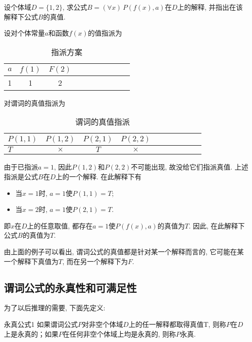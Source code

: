 \begin{example}
  设个体域$D=\{1, 2\}$, 求公式$B=(\forall x)\,P(f(x), a)$在$D$上的解释, 并指出在该解释下公式$B$的真值.
\end{example}
\begin{result}
设对个体常量$a$和函数$f(x)$的值指派为
\begin{table}[H]
\caption{指派方案}
\vspace{-0.6cm}
\begin{center}
\begin{tabular} {lccccccccc}
  \hline
$a$	&$f(1)$&$	F(2)$\\
\hline
1&	1	&2\\
\hline
\end{tabular}
\end{center}
\label{AI_table2019113003}
\end{table}
对谓词的真值指派为
\begin{table}[H]
\caption{谓词的真值指派}
\vspace{-0.6cm}
\begin{center}
\begin{tabular} {lccccccccc}
\hline
     $P(1,1)$&	  $P(1,2)$	&   $P(2,1)$&	   $P(2,2)$\\
\hline
     $T$	&   $\times$	&   $T$	&   $\times$	\\
\hline
\end{tabular}
\end{center}
\label{AI_table2019113004}
\end{table}
由于已指派$a=1$, 因此$P(1,2)$和$P(2,2)$不可能出现, 故没给它们指派真值.
上述指派是公式$B$在$D$上的一个解释. 在此解释下有
\begin{itemize}
\item 当$x=1$时, $a=1$使$P(1,1)=T$;
\item 当$x=2$时, $a=1$使$P(2,1)=T$.
\end{itemize}
即$x$在$D$上的任意取值, 都存在$a=1$使$P(f(x), a)$的真值为$T$. 因此, 在此解释下公式$B$的真值为$T$.
\end{result}
由上面的例子可以看出, 谓词公式的真值都是针对某一个解释而言的, 它可能在某一个解释下真值为$T$, 而在另一个解释下为$F$.
\subsection{谓词公式的永真性和可满足性}
 为了以后推理的需要, 下面先定义:
\begin{mydef}{永真公式}{1}
如果谓词公式$P$对非空个体域$D$上的任一解释都取得真值T, 则称$P$在$D$上是永真的；如果$P$在任何非空个体域上均是永真的, 则称$P$永真.
\end{mydef}

